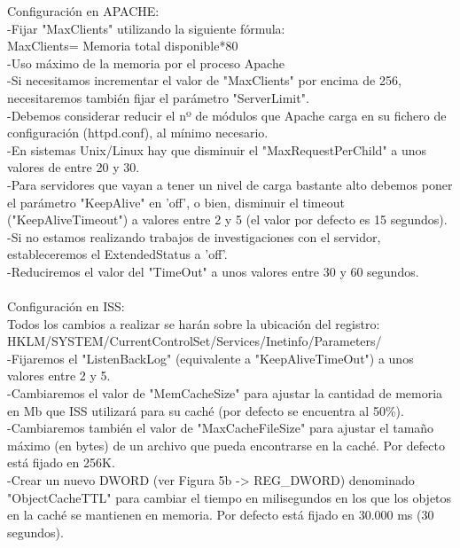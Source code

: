 Configuración en APACHE:\\
-Fijar "MaxClients" utilizando la siguiente fórmula:\\
MaxClients= Memoria total disponible*80\\
-Uso máximo de la memoria por el proceso Apache\\
-Si necesitamos incrementar el valor de "MaxClients" por encima de 256, necesitaremos también fijar el parámetro "ServerLimit".\\
-Debemos considerar reducir el nº de módulos que Apache carga en su fichero de configuración (httpd.conf), al mínimo necesario.\\
-En sistemas Unix/Linux hay que disminuir el "MaxRequestPerChild" a unos valores de entre 20 y 30.\\
-Para servidores que vayan a tener un nivel de carga bastante alto debemos poner el parámetro "KeepAlive" en 'off', o bien, disminuir el timeout ("KeepAliveTimeout") a valores entre 2 y 5 (el valor por defecto es 15 segundos).\\
-Si no estamos realizando trabajos de investigaciones con el servidor, estableceremos el ExtendedStatus a 'off'.\\
-Reduciremos el valor del "TimeOut" a unos valores entre 30 y 60 segundos.\\
\\
Configuración en ISS:\\
Todos los cambios a realizar se harán sobre la ubicación del registro:\\
HKLM/SYSTEM/CurrentControlSet/Services/Inetinfo/Parameters/ \\
-Fijaremos el "ListenBackLog" (equivalente a "KeepAliveTimeOut") a unos valores entre 2 y 5.\\
-Cambiaremos el valor de "MemCacheSize" para ajustar la cantidad de memoria en Mb que ISS utilizará para su caché (por defecto se encuentra al 50\%).\\
-Cambiaremos también el valor de "MaxCacheFileSize" para ajustar el tamaño máximo (en bytes) de un archivo que pueda encontrarse en la caché. Por defecto está fijado en 256K.\\
-Crear un nuevo DWORD (ver Figura 5b -> REG\_DWORD) denominado "ObjectCacheTTL" para cambiar el tiempo en milisegundos en los que los objetos en la caché se mantienen en memoria. Por defecto está fijado en 30.000 ms (30 segundos).\\
